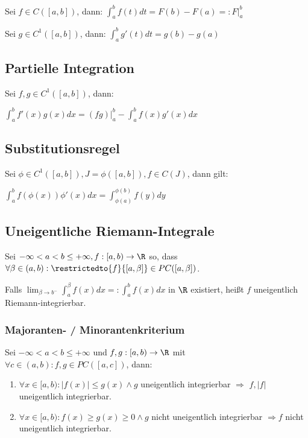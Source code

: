 Sei $f \in C([a, b])$, dann: $\int_a^b f(t) dt = F(b) - F(a) =: F|_a^b$

Sei $g \in C^1([a, b])$, dann: $\int_a^b g'(t) dt = g(b) - g(a)$

\subsection*{Partielle Integration}

Sei $f, g \in C^1([a, b])$, dann:

$\int_a^b f'(x)g(x) dx = (fg)|_a^b - \int_a^b f(x)g'(x) dx$

\subsection*{Substitutionsregel}

Sei $\phi \in C^1([a, b]), J = \phi([a,b]), f \in C(J)$, dann gilt:

$\int_a^b f(\phi(x))\phi'(x) dx = \int_{\phi(a)}^{\phi(b)} f(y) dy$

\subsection*{Uneigentliche Riemann-Integrale}

Sei $-\infty < a < b \leq +\infty, f : [a, b) \rightarrow \R$ so, dass $\forall \beta \in (a, b): \restrictedto{f}{[a, \beta]} \in PC([a, \beta])$.

Falls $\lim_{\beta \to b^-} \int_a^\beta f(x) dx =: \int_a^b f(x) dx$ in $\R$ existiert, heißt $f$ uneigentlich Riemann-integrierbar.

\subsubsection*{Majoranten- / Minorantenkriterium}

Sei $-\infty < a < b \leq +\infty$ und $f, g : [a, b) \to \R$ mit $\forall c \in (a, b) : f, g \in PC([a, c])$, dann:

\begin{enumerate}[label=(\alph*)]
	\item $\forall x \in [a, b) : |f(x)| \leq g(x) \land g$ uneigentlich integrierbar $\Rightarrow$ $f, |f|$ uneigentlich integrierbar.
	\item $\forall x \in [a, b): f(x) \geq g(x) \geq 0 \land g$ nicht uneigentlich integrierbar $\Rightarrow f$ nicht uneigentlich integrierbar.
\end{enumerate}

